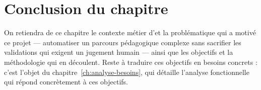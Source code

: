 \section*{Conclusion du chapitre}
On retiendra de ce chapitre le contexte métier d'\Entreprise et la
problématique qui a motivé ce projet --- automatiser un parcours
pédagogique complexe sans sacrifier les validations qui exigent un
jugement humain --- ainsi que les objectifs et la méthodologie qui en
découlent. Reste à traduire ces objectifs en besoins concrets : c'est
l'objet du chapitre~\ref{ch:analyse-besoins}, qui détaille l'analyse
fonctionnelle qui répond concrètement à ces objectifs.
